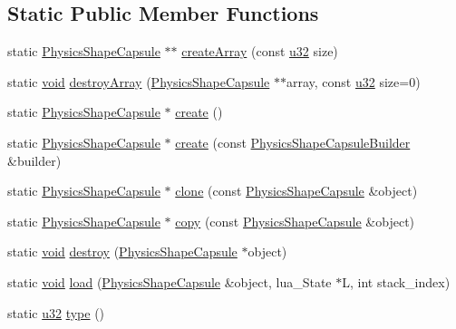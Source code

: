 \subsection*{Static Public Member Functions}
\begin{DoxyCompactItemize}
\item 
static \mbox{\hyperlink{classnjli_1_1_physics_shape_capsule}{Physics\+Shape\+Capsule}} $\ast$$\ast$ \mbox{\hyperlink{classnjli_1_1_physics_shape_capsule_a9234db71fb65c7514e32b384c07359ed}{create\+Array}} (const \mbox{\hyperlink{_util_8h_a10e94b422ef0c20dcdec20d31a1f5049}{u32}} size)
\item 
static \mbox{\hyperlink{_thread_8h_af1e856da2e658414cb2456cb6f7ebc66}{void}} \mbox{\hyperlink{classnjli_1_1_physics_shape_capsule_a1208e5bd3514c6a4259b312322575e2a}{destroy\+Array}} (\mbox{\hyperlink{classnjli_1_1_physics_shape_capsule}{Physics\+Shape\+Capsule}} $\ast$$\ast$array, const \mbox{\hyperlink{_util_8h_a10e94b422ef0c20dcdec20d31a1f5049}{u32}} size=0)
\item 
static \mbox{\hyperlink{classnjli_1_1_physics_shape_capsule}{Physics\+Shape\+Capsule}} $\ast$ \mbox{\hyperlink{classnjli_1_1_physics_shape_capsule_a735bd23707d27292b7d94124afffed5d}{create}} ()
\item 
static \mbox{\hyperlink{classnjli_1_1_physics_shape_capsule}{Physics\+Shape\+Capsule}} $\ast$ \mbox{\hyperlink{classnjli_1_1_physics_shape_capsule_a4c14553480dab63092c10f6b9cac7fe2}{create}} (const \mbox{\hyperlink{classnjli_1_1_physics_shape_capsule_builder}{Physics\+Shape\+Capsule\+Builder}} \&builder)
\item 
static \mbox{\hyperlink{classnjli_1_1_physics_shape_capsule}{Physics\+Shape\+Capsule}} $\ast$ \mbox{\hyperlink{classnjli_1_1_physics_shape_capsule_ab697ab88912433e342844d090492cd7d}{clone}} (const \mbox{\hyperlink{classnjli_1_1_physics_shape_capsule}{Physics\+Shape\+Capsule}} \&object)
\item 
static \mbox{\hyperlink{classnjli_1_1_physics_shape_capsule}{Physics\+Shape\+Capsule}} $\ast$ \mbox{\hyperlink{classnjli_1_1_physics_shape_capsule_a0340921c913c7b57a0b553876471bf98}{copy}} (const \mbox{\hyperlink{classnjli_1_1_physics_shape_capsule}{Physics\+Shape\+Capsule}} \&object)
\item 
static \mbox{\hyperlink{_thread_8h_af1e856da2e658414cb2456cb6f7ebc66}{void}} \mbox{\hyperlink{classnjli_1_1_physics_shape_capsule_ab8862c509b556bab997e596e4181fdd8}{destroy}} (\mbox{\hyperlink{classnjli_1_1_physics_shape_capsule}{Physics\+Shape\+Capsule}} $\ast$object)
\item 
static \mbox{\hyperlink{_thread_8h_af1e856da2e658414cb2456cb6f7ebc66}{void}} \mbox{\hyperlink{classnjli_1_1_physics_shape_capsule_ae4e2004100028feb7f7af4c9dab34569}{load}} (\mbox{\hyperlink{classnjli_1_1_physics_shape_capsule}{Physics\+Shape\+Capsule}} \&object, lua\+\_\+\+State $\ast$L, int stack\+\_\+index)
\item 
static \mbox{\hyperlink{_util_8h_a10e94b422ef0c20dcdec20d31a1f5049}{u32}} \mbox{\hyperlink{classnjli_1_1_physics_shape_capsule_a8d41dedd4e23513219a6f598b1a7007b}{type}} ()
\end{DoxyCompactItemize}
